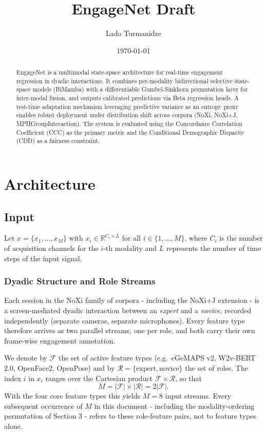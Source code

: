 \documentclass[11pt,a4paper]{article}
\newcommand{\R}{\mathbb{R}}
\begin{document}
	
	\title{\textbf{EngageNet Draft}}
	\author{Lado Turmanidze}
	\date{\today}
	\maketitle
	
	\begin{abstract}
		EngageNet is a multimodal state-space architecture for real-time engagement regression in dyadic interactions. It combines per-modality bidirectional selective state-space models (BiMamba) with a differentiable Gumbel-Sinkhorn permutation layer for inter-modal fusion, and outputs calibrated predictions via Beta regression heads. A test-time adaptation mechanism leveraging predictive variance as an entropy proxy enables robust deployment under distribution shift across corpora (NoXi, NoXi+J, MPIIGroupInteraction). The system is evaluated using the Concordance Correlation Coefficient (CCC) as the primary metric and the Conditional Demographic Disparity (CDD) as a fairness constraint.
	\end{abstract}

	\section{Architecture}
	\subsection{Input}
	Let $x=\{x_{1},\dots,x_{M}\}$ with $x_{i}\in\R^{C_{i}\times L}$ for all $i\in\{1,\dots,M\}$, where $C_{i}$ is the number of acquisition channels for the $i$-th modality and $L$ represents the number of time steps of the input signal.
	
	\subsubsection{Dyadic Structure and Role Streams}
	Each session in the NoXi \cite{cafaro2017noxi} family of corpora - including the NoXi+J extension \cite{funk2024noxij} - is a screen-mediated dyadic interaction between an \emph{expert} and a \emph{novice}, recorded independently (separate cameras, separate microphones). Every feature type therefore arrives as two parallel streams, one per role, and both carry their own frame-wise engagement annotation.
	
	We denote by $\mathcal{F}$ the set of active feature types (e.g.\ eGeMAPS v2, W2v-BERT 2.0, OpenFace2, OpenPose) and by $\mathcal{R}=\{\text{expert},\text{novice}\}$ the set of roles. The index $i$ in $x_i$ ranges over the Cartesian product $\mathcal{F}\times\mathcal{R}$, so that
	$$M = |\mathcal{F}| \times |\mathcal{R}| = 2|\mathcal{F}|.$$
	With the four core feature types this yields $M = 8$ input streams. Every subsequent occurrence of $M$ in this document - including the modality-ordering permutation of Section 3 - refers to these role-feature pairs, not to feature types alone.
	
\end{document}
